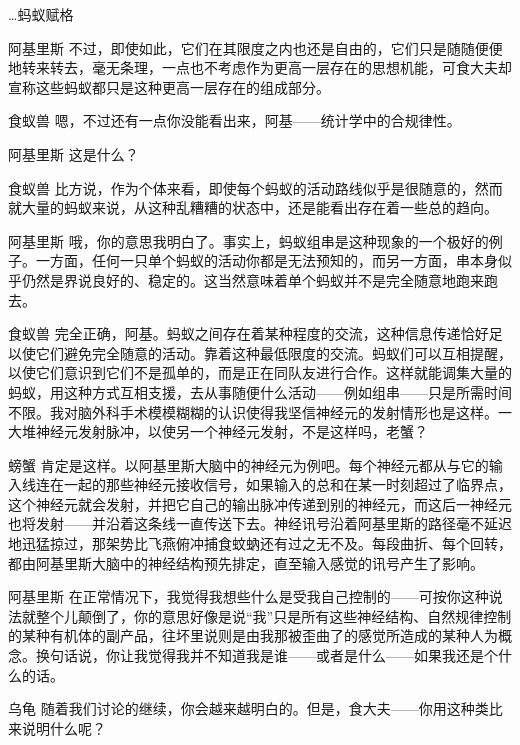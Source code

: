 \begin{dialog}{…蚂蚁赋格}
\begin{dialogue}
\item[阿基里斯]不过，即使如此，它们在其限度之内也还是自由的，它们只是随随便便地转来转去，毫无条理，一点也不考虑作为更高一层存在的思想机能，可食大夫却宣称这些蚂蚁都只是这种更高一层存在的组成部分。

\item[食蚁兽]嗯，不过还有一点你没能看出来，阿基——统计学中的合规律性。

\item[阿基里斯]这是什么？

\item[食蚁兽]比方说，作为个体来看，即使每个蚂蚁的活动路线似乎是很随意的，然而就大量的蚂蚁来说，从这种乱糟糟的状态中，还是能看出存在着一些总的趋向。

\item[阿基里斯]哦，你的意思我明白了。事实上，蚂蚁组串是这种现象的一个极好的例子。一方面，任何一只单个蚂蚁的活动你都是无法预知的，而另一方面，串本身似乎仍然是界说良好的、稳定的。这当然意味着单个蚂蚁并不是完全随意地跑来跑去。

\item[食蚁兽]完全正确，阿基。蚂蚁之间存在着某种程度的交流，这种信息传递恰好足以使它们避免完全随意的活动。靠着这种最低限度的交流。蚂蚁们可以互相提醒，以使它们意识到它们不是孤单的，而是正在同队友进行合作。这样就能调集大量的蚂蚁，用这种方式互相支援，去从事随便什么活动——例如组串——只是所需时间不限。我对脑外科手术模模糊糊的认识使得我坚信神经元的发射情形也是这样。一大堆神经元发射脉冲，以使另一个神经元发射，不是这样吗，老蟹？

\item[螃蟹]肯定是这样。以阿基里斯大脑中的神经元为例吧。每个神经元都从与它的输入线连在一起的那些神经元接收信号，如果输入的总和在某一时刻超过了临界点，这个神经元就会发射，并把它自己的输出脉冲传递到别的神经元，而这后一神经元也将发射——并沿着这条线一直传送下去。神经讯号沿着阿基里斯的路径毫不延迟地迅猛掠过，那架势比飞燕俯冲捕食蚊蚋还有过之无不及。每段曲折、每个回转，都由阿基里斯大脑中的神经结构预先排定，直至输入感觉的讯号产生了影响。

\item[阿基里斯]在正常情况下，我觉得我想些什么是受我自己控制的——可按你这种说法就整个儿颠倒了，你的意思好像是说“我”只是所有这些神经结构、自然规律控制的某种有机体的副产品，往坏里说则是由我那被歪曲了的感觉所造成的某种人为概念。换句话说，你让我觉得我并不知道我是谁——或者是什么——如果我还是个什么的话。

\item[乌龟]随着我们讨论的继续，你会越来越明白的。但是，食大夫——你用这种类比来说明什么呢？


\end{dialogue}
\end{dialog}
